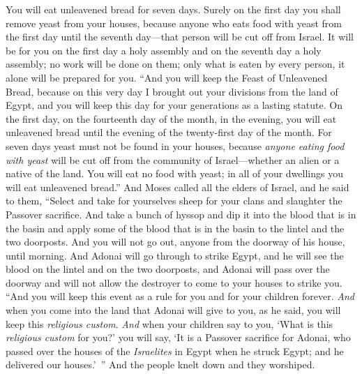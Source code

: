 \begin{biblechapter}
\verse You will eat unleavened bread for seven days. Surely on the first day you shall remove yeast from your houses, because anyone who eats food with yeast from the first day until the seventh day—that person will be cut off from Israel.
\verse It will be for you on the first day a holy assembly and on the seventh day a holy assembly; no work will be done on them; only what is eaten by every person, it alone will be prepared for you.
\verse “And you will keep the Feast of Unleavened Bread, because on this very day I brought out your divisions from the land of Egypt, and you will keep this day for your generations as a lasting statute.
\verse On the first day, on the fourteenth day of the month, in the evening, you will eat unleavened bread until the evening of the twenty-first day of the month.
\verse For seven days yeast must not be found in your houses, because \textit{anyone eating food with yeast} will be cut off from the community of Israel—whether an alien or a native of the land.
\verse You will eat no food with yeast; in all of your dwellings you will eat unleavened bread.”
\verse And Moses called all the elders of Israel, and he said to them, “Select and take for yourselves sheep for your clans and slaughter the Passover sacrifice.
\verse And take a bunch of hyssop and dip it into the blood that is in the basin and apply some of the blood that is in the basin to the lintel and the two doorposts. And you will not go out, anyone from the doorway of his house, until morning.
\verse And Adonai will go through to strike Egypt, and he will see the blood on the lintel and on the two doorposts, and Adonai will pass over the doorway and will not allow the destroyer to come to your houses to strike you.
\verse “And you will keep this event as a rule for you and for your children forever.
\verse \textit{And} when you come into the land that Adonai will give to you, as he said, you will keep this \textit{religious custom}.
\verse \textit{And} when your children say to you, ‘What is this \textit{religious custom} for you?’
\verse you will say, ‘It is a Passover sacrifice for Adonai, who passed over the houses of the \textit{Israelites} in Egypt when he struck Egypt; and he delivered our houses.’ ” And the people knelt down and they worshiped.

\end{biblechapter}
